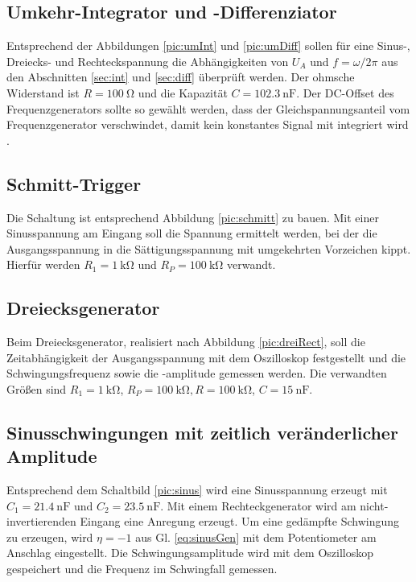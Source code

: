 \subsection{Umkehr-Integrator und -Differenziator}
Entsprechend der Abbildungen \ref{pic:umInt} und \ref{pic:umDiff}
sollen für eine Sinus-, Dreiecks- und Rechteckspannung die Abhängigkeiten
von $U_A$ und $f=\omega/2\pi$ aus den Abschnitten \ref{sec:int} und
\ref{sec:diff} überprüft werden. Der ohmsche Widerstand ist
$R = \SI{100}{\ohm}$ und die Kapazität $C = \SI{102,3}{\nano\farad}$.
Der DC-Offset des Frequenzgenerators sollte so gewählt werden, dass der Gleichspannungsanteil
vom Frequenzgenerator verschwindet, damit kein konstantes Signal
mit integriert wird \cite{Anl}.

\subsection{Schmitt-Trigger}
Die Schaltung ist entsprechend Abbildung \ref{pic:schmitt} zu bauen.
Mit einer Sinusspannung am Eingang soll die Spannung ermittelt werden,
bei der die Ausgangsspannung in die Sättigungsspannung mit umgekehrten
Vorzeichen kippt. Hierfür werden $R_1 = \SI{1}{\kilo\ohm}$ und
$R_P = \SI{100}{\kilo\ohm}$ verwandt.

\subsection{Dreiecksgenerator}
Beim Dreiecksgenerator, realisiert nach Abbildung \ref{pic:dreiRect},
soll die Zeitabhängigkeit der Ausgangsspannung mit dem Oszilloskop
festgestellt und die Schwingungsfrequenz sowie die -amplitude gemessen werden.
Die verwandten Größen sind $R_1 = \SI{1}{\kilo\ohm}$, $R_P = \SI{100}{\kilo\ohm},
R= \SI{100}{\kilo\ohm}$, $C = \SI{15}{\nano\farad}$.

\subsection{Sinusschwingungen mit zeitlich veränderlicher Amplitude}
Entsprechend dem Schaltbild \ref{pic:sinus} wird eine Sinusspannung
erzeugt mit $C_1 = \SI{21,4}{\nano\farad}$ und $C_2  = \SI{23,5}{\nano\farad}$.
Mit einem Rechteckgenerator wird am nicht-invertierenden Eingang
eine Anregung erzeugt. Um eine gedämpfte Schwingung zu erzeugen, wird $\eta = -1$ 
aus Gl. \eqref{eq:sinusGen} mit dem Potentiometer am Anschlag eingestellt.
Die Schwingungsamplitude wird mit dem Oszilloskop gespeichert und
die Frequenz im Schwingfall gemessen.



